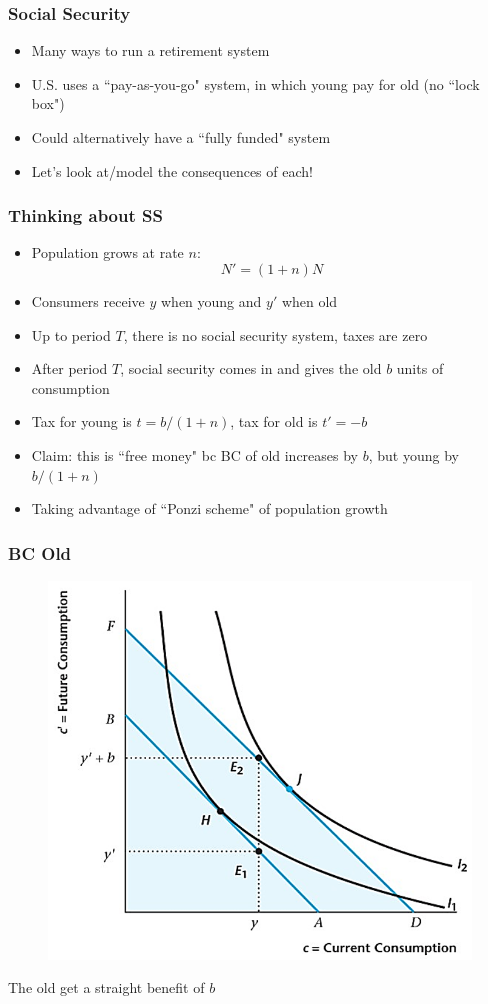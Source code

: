 \documentclass{beamer}
\begin{document}
\begin{frame}
\frametitle[alignment=center]{Social Security}
\begin{itemize}
\item Many ways to run a retirement system
\bigskip
\item U.S. uses a ``pay-as-you-go" system, in which young pay for old (no ``lock box")
\bigskip
\item Could alternatively have a ``fully funded" system
\bigskip
\item Let's look at/model the consequences of each!
\end{itemize}
 \end{frame}

\begin{frame}
\frametitle[alignment=center]{Thinking about SS}
\begin{itemize}
\item Population grows at rate $n$:
$$N'=(1+n)N$$
\item Consumers receive $y$ when young and $y'$ when old
\bigskip
\item Up to period $T$, there is no social security system, taxes are zero
\bigskip
\item After period $T$, social security comes in and gives the old $b$ units of consumption
\bigskip
\item Tax for young is $t=b/(1+n)$, tax for old is $t'=-b$
\bigskip
\item Claim: this is ``free money" bc BC of old increases by $b$, but young by $b/(1+n)$
\bigskip
\item Taking advantage of ``Ponzi scheme" of population growth
\end{itemize}
 \end{frame}


\begin{frame}
\frametitle[alignment=center]{BC Old}
\begin{figure}
\centering
\includegraphics[scale=0.5]{Figures/W_Fig_10pt8.png}
\end{figure}
The old get a straight benefit of $b$
 \end{frame}
\end{document}
